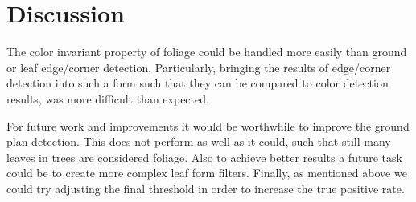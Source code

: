 \documentclass[fleqn,10pt]{SelfArx} %
\begin{document}
\section{Discussion}

The color invariant property of foliage could be handled more easily than ground or leaf edge/corner detection. Particularly, bringing the results of edge/corner detection into such a form such that they can be compared to color detection results, was more difficult than expected. 

For future work and improvements it would be worthwhile to improve the ground plan detection. This does not perform as well as it could, such that still many leaves in trees are considered foliage. Also to achieve better results a future task could be to create more complex leaf form filters. Finally, as mentioned above we could try adjusting the final threshold in order to increase the true positive rate.
\end{document}

